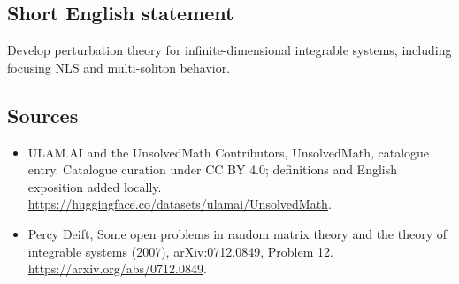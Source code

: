\documentclass[11pt]{article}
\begin{document}
\subsection{Short English statement}
Develop perturbation theory for infinite-dimensional integrable systems, including focusing NLS and multi-soliton behavior.
\subsection{Sources}
\begin{itemize}
\item[\hypertarget{source:statement:1}{S1}] ULAM.AI and the UnsolvedMath Contributors, UnsolvedMath, catalogue entry. Catalogue curation under CC BY 4.0; definitions and English exposition added locally.
\url{https://huggingface.co/datasets/ulamai/UnsolvedMath}.
\item[\hypertarget{source:statement:2}{S2}] Percy Deift, Some open problems in random matrix theory and the theory of integrable systems (2007), arXiv:0712.0849, Problem 12.
\url{https://arxiv.org/abs/0712.0849}.
\end{itemize}
\label{end:statement}
\end{document}
